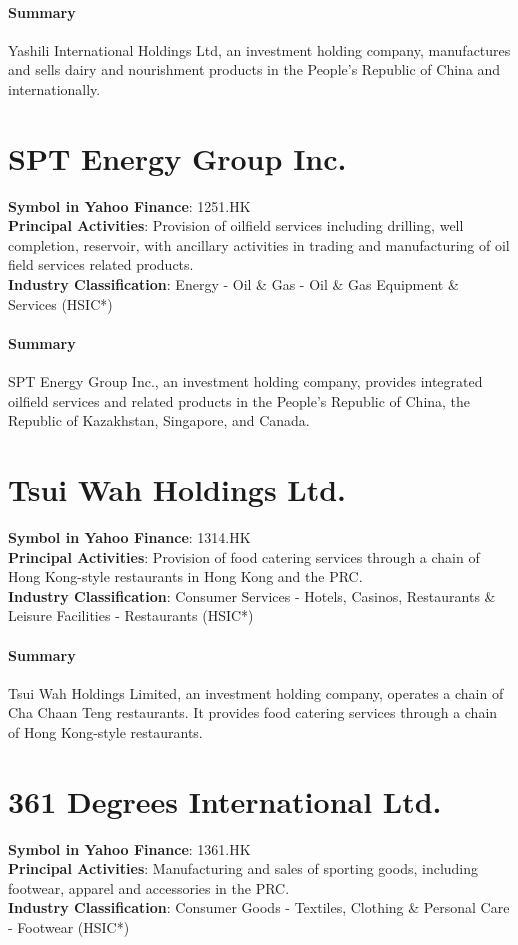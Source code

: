 \paragraph{Summary}
Yashili International Holdings Ltd, an investment holding company, manufactures and sells dairy and nourishment products in the People's Republic of China and internationally.


\section{SPT Energy Group Inc.}
\textbf{Symbol in Yahoo Finance}: 1251.HK\\
\textbf{Principal Activities}: Provision of oilfield services including drilling, well completion, reservoir, with ancillary activities in trading and manufacturing of oil field services related products.\\
\textbf{Industry Classification}: Energy - Oil \& Gas - Oil \& Gas Equipment \& Services (HSIC*)
\paragraph{Summary}
SPT Energy Group Inc., an investment holding company, provides integrated oilfield services and related products in the People's Republic of China, the Republic of Kazakhstan, Singapore, and Canada.


\section{Tsui Wah Holdings Ltd.}
\textbf{Symbol in Yahoo Finance}: 1314.HK\\
\textbf{Principal Activities}: Provision of food catering services through a chain of Hong Kong-style restaurants in Hong Kong and the PRC.\\
\textbf{Industry Classification}: Consumer Services - Hotels, Casinos, Restaurants \& Leisure Facilities - Restaurants (HSIC*)
\paragraph{Summary}
Tsui Wah Holdings Limited, an investment holding company, operates a chain of Cha Chaan Teng restaurants. It provides food catering services through a chain of Hong Kong-style restaurants.


\section{361 Degrees International Ltd.}
\textbf{Symbol in Yahoo Finance}: 1361.HK\\
\textbf{Principal Activities}: Manufacturing and sales of sporting goods, including footwear, apparel and accessories in the PRC.\\
\textbf{Industry Classification}: Consumer Goods - Textiles, Clothing \& Personal Care - Footwear (HSIC*)

